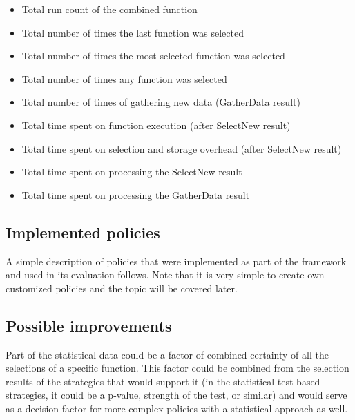 \begin{itemize}
	\item Total run count of the combined function
	\item Total number of times the last function was selected
	\item Total number of times the most selected function was selected
	\item Total number of times any function was selected
	\item Total number of times of gathering new data (GatherData result)
	\item Total time spent on function execution (after SelectNew result)
	\item Total time spent on selection and storage overhead (after SelectNew result)
	\item Total time spent on processing the SelectNew result
	\item Total time spent on processing the GatherData result
\end{itemize}

\subsection{Implemented policies}

A simple description of policies that were implemented as part of the framework and used in its evaluation follows. Note that it is very simple to create own customized policies and the topic will be covered later.



\subsection{Possible improvements}

Part of the statistical data could be a factor of combined certainty of all the selections of a specific function. This factor could be combined from the selection results of the strategies that would support it (in the statistical test based strategies, it could be a p-value, strength of the test, or similar) and would serve as a decision factor for more complex policies with a statistical approach as well.

